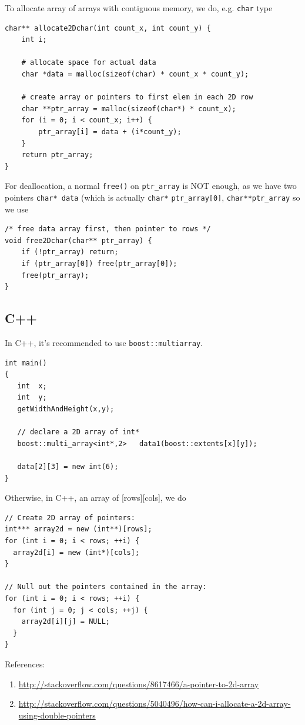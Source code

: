 To allocate array of arrays with contiguous memory, we do, e.g. \verb!char! type  
\begin{lstlisting}
char** allocate2Dchar(int count_x, int count_y) {
    int i;

    # allocate space for actual data
    char *data = malloc(sizeof(char) * count_x * count_y);

    # create array or pointers to first elem in each 2D row
    char **ptr_array = malloc(sizeof(char*) * count_x);
    for (i = 0; i < count_x; i++) {
        ptr_array[i] = data + (i*count_y);
    }
    return ptr_array;
}
\end{lstlisting}
For deallocation, a normal \verb!free()! on \verb!ptr_array! is NOT enough, as
we have two pointers \verb!char* data! (which is actually \verb!char*!
\verb!ptr_array[0]!, \verb!char**ptr_array! so we use
\begin{lstlisting}
/* free data array first, then pointer to rows */
void free2Dchar(char** ptr_array) {
    if (!ptr_array) return;
    if (ptr_array[0]) free(ptr_array[0]);
    free(ptr_array);
}
\end{lstlisting}

\subsection{C++}

In C++, it's recommended to use \verb!boost::multiarray!. 
\begin{lstlisting}
int main()
{
   int  x;
   int  y;
   getWidthAndHeight(x,y);

   // declare a 2D array of int*
   boost::multi_array<int*,2>   data1(boost::extents[x][y]);

   data[2][3] = new int(6);
}
\end{lstlisting}
Otherwise, in C++, an
array of [rows][cols], we do
\begin{lstlisting}
// Create 2D array of pointers:
int*** array2d = new (int**)[rows];
for (int i = 0; i < rows; ++i) {
  array2d[i] = new (int*)[cols];
}

// Null out the pointers contained in the array:
for (int i = 0; i < rows; ++i) {
  for (int j = 0; j < cols; ++j) {
    array2d[i][j] = NULL;
  }
}
\end{lstlisting}

References:
\begin{enumerate}
  \item \url{http://stackoverflow.com/questions/8617466/a-pointer-to-2d-array}
  \item
  \url{http://stackoverflow.com/questions/5040496/how-can-i-allocate-a-2d-array-using-double-pointers}
\end{enumerate}

